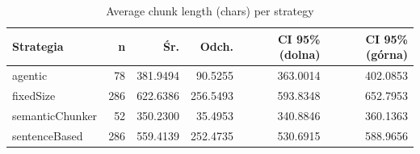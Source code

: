 \begin{table}[H]
    \centering
    \caption{Average chunk length (chars) per strategy}
    \small
    \begin{tabular}{@{}lrrrrr@{}}
        \toprule
        \textbf{Strategia} & \textbf{n} & \textbf{Śr.} & \textbf{Odch.} & \textbf{CI 95\% (dolna)} & \textbf{CI 95\% (górna)} \\
        \midrule
        agentic & 78 & 381.9494 & 90.5255 & 363.0014 & 402.0853 \\
        fixedSize & 286 & 622.6386 & 256.5493 & 593.8348 & 652.7953 \\
        semanticChunker & 52 & 350.2300 & 35.4953 & 340.8846 & 360.1363 \\
        sentenceBased & 286 & 559.4139 & 252.4735 & 530.6915 & 588.9656 \\
        \bottomrule
    \end{tabular}
\end{table}
